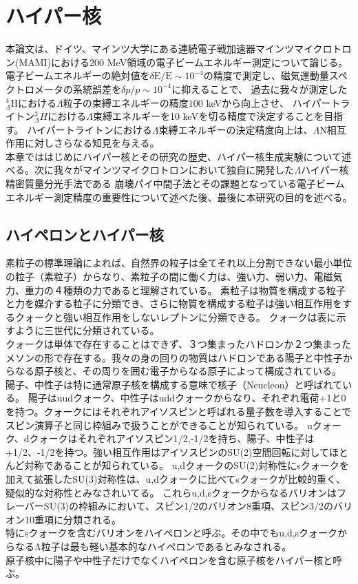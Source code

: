\documentclass[a4paper,11pt,uplatex]{jsarticle}
\begin{document}
\section{ハイパー核}
本論文は、ドイツ、マインツ大学にある連続電子戦加速器マインツマイクロトロン(MAMI)における200 MeV領域の電子ビームエネルギー測定について論じる。
電子ビームエネルギーの絶対値を$\delta \text{E}/\text{E} \sim 10^{-4}$の精度で測定し、磁気運動量スペクトロメータの系統誤差を$\delta p/p \sim 10^{-4}$に抑えることで、
過去に我々が測定した$^4_{\Lambda} \text{H}$における$\Lambda$粒子の束縛エネルギーの精度$100$ keVから向上させ、
ハイパートライトン$^3_{\Lambda}H$における$\Lambda$束縛エネルギーを10 keVを切る精度で決定することを目指す。
ハイパートライトンにおける$\Lambda$束縛エネルギーの決定精度向上は、$\Lambda$N相互作用に対しさらなる知見を与える。\\
本章でははじめにハイパー核とその研究の歴史、ハイパー核生成実験について述べる。次に我々がマインツマイクロトロンにおいて独自に開発した$\Lambda$ハイパー核精密質量分光手法である
崩壊パイ中間子法とその課題となっている電子ビームエネルギー測定精度の重要性について述べた後、最後に本研究の目的を述べる。

\subsection{ハイペロンとハイパー核}
素粒子の標準理論によれば、自然界の粒子は全てそれ以上分割できない最小単位の粒子（素粒子）からなり、素粒子の間に働く力は、強い力、弱い力、電磁気力、重力の４種類の力であると理解されている。
素粒子は物質を構成する粒子と力を媒介する粒子に分類でき、さらに物質を構成する粒子は強い相互作用をするクォークと強い相互作用をしないレプトンに分類できる。
クォークは表に示すように三世代に分類されている。\\
クォークは単体で存在することはできず、３つ集まったハドロンか２つ集まったメソンの形で存在する。我々の身の回りの物質はハドロンである陽子と中性子からなる原子核と、その周りを囲む電子からなる原子によって構成されている。
陽子、中性子は特に通常原子核を構成する意味で核子（Neucleon）と呼ばれている。
陽子はuudクォーク、中性子はuddクォークからなり、それぞれ電荷+1と0を持つ。クォークにはそれぞれアイソスピンと呼ばれる量子数を導入することでスピン演算子と同じ枠組みで扱うことができることが知られている。
uクォーク、dクォークはそれぞれアイソスピン1/2,-1/2を持ち、陽子、中性子は+1/2、-1/2を持つ。強い相互作用はアイソスピンのSU(2)空間回転に対してほとんど対称であることが知られている。
u,dクォークのSU(2)対称性にsクォークを加えて拡張したSU(3)対称性は、u,dクォークに比べてsクォークが比較的重く、疑似的な対称性とみなされいてる。
これらu,d,sクォークからなるバリオンはフレーバーSU(3)の枠組みにおいて、スピン1/2のバリオン8重項、スピン3/2のバリオン10重項に分類される。\\
特にsクォークを含むバリオンをハイペロンと呼ぶ。その中でもu,d,sクォークからなるΛ粒子は最も軽い基本的なハイペロンであるとみなされる。\\
原子核中に陽子や中性子だけでなくハイペロンを含む原子核をハイパー核と呼ぶ。
\end{document}
